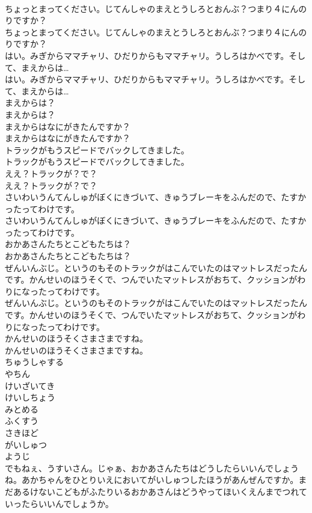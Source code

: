 \documentclass[8pt]{extreport}
\begin{document}
\begin{CJK}{UTF8}{min}
\\	ちょっとまってください。じてんしゃのまえとうしろとおんぶ？つまり４にんのりですか？
\\	ちょっとまってください。じてんしゃのまえとうしろとおんぶ？つまり４にんのりですか？
\\	はい。みぎからママチャリ、ひだりからもママチャリ。うしろはかべです。そして、まえからは…
\\	はい。みぎからママチャリ、ひだりからもママチャリ。うしろはかべです。そして、まえからは…
\\	まえからは？
\\	まえからは？
\\	まえからはなにがきたんですか？
\\	まえからはなにがきたんですか？
\\	トラックがもうスピードでバックしてきました。
\\	トラックがもうスピードでバックしてきました。
\\	ええ？トラックが？で？
\\	ええ？トラックが？で？
\\	さいわいうんてんしゅがぼくにきづいて、きゅうブレーキをふんだので、たすかったってわけです。
\\	さいわいうんてんしゅがぼくにきづいて、きゅうブレーキをふんだので、たすかったってわけです。
\\	おかあさんたちとこどもたちは？
\\	おかあさんたちとこどもたちは？
\\	ぜんいんぶじ。というのもそのトラックがはこんでいたのはマットレスだったんです。かんせいのほうそくで、つんでいたマットレスがおちて、クッションがわりになったってわけです。
\\	ぜんいんぶじ。というのもそのトラックがはこんでいたのはマットレスだったんです。かんせいのほうそくで、つんでいたマットレスがおちて、クッションがわりになったってわけです。
\\	かんせいのほうそくさまさまですね。
\\	かんせいのほうそくさまさまですね。
\\	ちゅうしゃする
\\	やちん
\\	けいざいてき
\\	けいしちょう
\\	みとめる
\\	ふくすう
\\	さきほど
\\	がいしゅつ
\\	ようじ
\\	でもねぇ、うすいさん。じゃぁ、おかあさんたちはどうしたらいいんでしょうね。あかちゃんをひとりいえにおいてがいしゅつしたほうがあんぜんですか。まだあるけないこどもがふたりいるおかあさんはどうやってほいくえんまでつれていったらいいんでしょうか。

\end{CJK}
\end{document}

